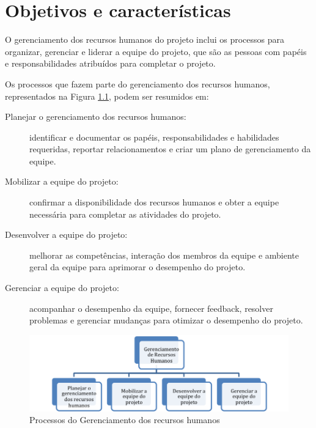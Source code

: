 \chapter{Objetivos e características}

O gerenciamento dos recursos humanos do projeto inclui os processos para organizar, gerenciar e liderar a equipe do projeto, que são as pessoas com papéis e responsabilidades atribuídos para completar o projeto.

Os processos que fazem parte do gerenciamento dos recursos humanos, representados na Figura \ref{fig:proc:ger:rh}, podem ser resumidos em:

\begin{description}

	\item[Planejar o gerenciamento dos recursos humanos:] identificar e documentar os papéis, responsabilidades e habilidades requeridas, reportar relacionamentos e criar um plano de gerenciamento da equipe.
	
	\item[Mobilizar a equipe do projeto:] confirmar a disponibilidade dos recursos humanos e obter a equipe necessária para completar as atividades do projeto.
	
	\item[Desenvolver a equipe do projeto:] melhorar as competências, interação dos membros da equipe e ambiente geral da equipe para aprimorar o desempenho do projeto.
	
	\item[Gerenciar a equipe do projeto:] acompanhar o desempenho da equipe, fornecer feedback, resolver problemas e gerenciar mudanças para otimizar o desempenho do projeto.

\end{description}

\begin{figure}[!h]
	\centering
	\includegraphics[scale=0.75]{Figuras/gerenciamento_rh.png}
	\caption{Processos do Gerenciamento dos recursos humanos}
	\label{fig:proc:ger:rh}
\end{figure}

